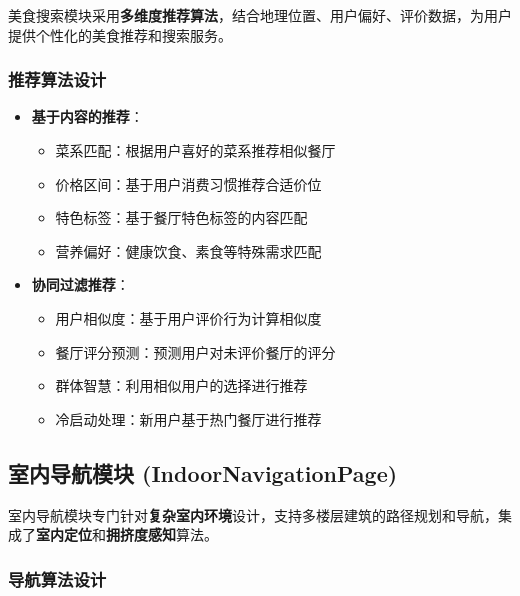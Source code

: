 \documentclass[12pt,a4paper]{article}
\begin{document}
\begin{designbox}[title={个性化美食发现}]
美食搜索模块采用\textbf{多维度推荐算法}，结合地理位置、用户偏好、评价数据，为用户提供个性化的美食推荐和搜索服务。
\end{designbox}

\subsubsection{推荐算法设计}

\begin{itemize}
    \item \textbf{基于内容的推荐}：
    \begin{itemize}
        \item 菜系匹配：根据用户喜好的菜系推荐相似餐厅
        \item 价格区间：基于用户消费习惯推荐合适价位
        \item 特色标签：基于餐厅特色标签的内容匹配
        \item 营养偏好：健康饮食、素食等特殊需求匹配
    \end{itemize}
    
    \item \textbf{协同过滤推荐}：
    \begin{itemize}
        \item 用户相似度：基于用户评价行为计算相似度
        \item 餐厅评分预测：预测用户对未评价餐厅的评分
        \item 群体智慧：利用相似用户的选择进行推荐
        \item 冷启动处理：新用户基于热门餐厅进行推荐
    \end{itemize}
\end{itemize}

\subsection{室内导航模块 (IndoorNavigationPage)}

\begin{designbox}[title={多楼层导航系统}]
室内导航模块专门针对\textbf{复杂室内环境}设计，支持多楼层建筑的路径规划和导航，集成了\textbf{室内定位}和\textbf{拥挤度感知}算法。
\end{designbox}

\subsubsection{导航算法设计}
\end{document}
